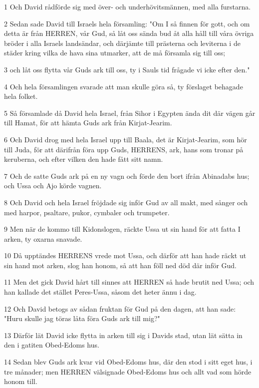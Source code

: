 \par 1 Och David rådförde sig med över- och underhövitsmännen, med alla furstarna.
\par 2 Sedan sade David till Israels hela församling: "Om I så finnen för gott, och om detta är från HERREN, vår Gud, så låt oss sända bud åt alla håll till våra övriga bröder i alla Israels landsändar, och därjämte till prästerna och leviterna i de städer kring vilka de hava sina utmarker, att de må församla sig till oss;
\par 3 och låt oss flytta vår Guds ark till oss, ty i Sauls tid frågade vi icke efter den."
\par 4 Och hela församlingen svarade att man skulle göra så, ty förslaget behagade hela folket.
\par 5 Så församlade då David hela Israel, från Sihor i Egypten ända dit där vägen går till Hamat, för att hämta Guds ark från Kirjat-Jearim.
\par 6 Och David drog med hela Israel upp till Baala, det är Kirjat-Jearim, som hör till Juda, för att därifrån föra upp Guds, HERRENS, ark, hans som tronar på keruberna, och efter vilken den hade fått sitt namn.
\par 7 Och de satte Guds ark på en ny vagn och förde den bort ifrån Abinadabs hus; och Ussa och Ajo körde vagnen.
\par 8 Och David och hela Israel fröjdade sig inför Gud av all makt, med sånger och med harpor, psaltare, pukor, cymbaler och trumpeter.
\par 9 Men när de kommo till Kidonslogen, räckte Ussa ut sin hand för att fatta I arken, ty oxarna snavade.
\par 10 Då upptändes HERRENS vrede mot Ussa, och därför att han hade räckt ut sin hand mot arken, slog han honom, så att han föll ned död där inför Gud.
\par 11 Men det gick David hårt till sinnes att HERREN så hade brutit ned Ussa; och han kallade det stället Peres-Ussa, såsom det heter ännu i dag.
\par 12 Och David betogs av sådan fruktan för Gud på den dagen, att han sade: "Huru skulle jag töras låta föra Guds ark till mig?"
\par 13 Därför lät David icke flytta in arken till sig i Davids stad, utan lät sätta in den i gatiten Obed-Edoms hus.
\par 14 Sedan blev Guds ark kvar vid Obed-Edoms hus, där den stod i sitt eget hus, i tre månader; men HERREN välsignade Obed-Edoms hus och allt vad som hörde honom till.

